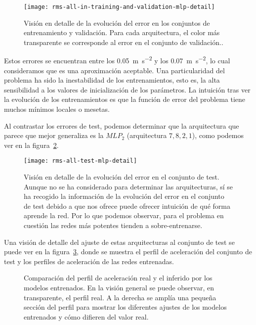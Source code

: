 \begin{figure}
	\centering
	\texttt{[image: rms-all-in-training-and-validation-mlp-detail]}
	\caption[Evolución del error en entrenamiento en los \ac{mlp} para las arquitecturas seleccionadas]{Visión en detalle de la evolución del error en los conjuntos de entrenamiento y validación. Para cada arquitectura, el color más transparente se corresponde al error en el conjunto de validación..}
	\label{fig:rms-all-in-training-and-validation-mlp-detail}
\end{figure}

Estos errores se encuentran entre los \SI{0.05}{\metre\per\square\second} y los \SI{0.07}{\metre\per\square\second}, lo cual consideramos que es una aproximación aceptable. Una particularidad del problema ha sido la inestabilidad de los entrenamientos, esto es, la alta sensibilidad a los valores de inicialización de los parámetros. La intuición tras ver la evolución de los entrenamientos es que la función de error del problema tiene muchos mínimos locales o mesetas.

Al contrastar los errores de test, podemos determinar que la arquitectura que parece que mejor generaliza es la $MLP_2$ (arquitectura $7, 8, 2, 1$), como podemos ver en la figura~\ref{fig:rms-all-test-mlp-detail}.

\begin{figure}
	\centering
	\texttt{[image: rms-all-test-mlp-detail]}
	\caption[Evolución del error en el conjunto de test durante el entrenamiento]{Visión en detalle de la evolución del error en el conjunto de test. Aunque no se ha considerado para determinar las arquitecturas, sí se ha recogido la información de la evolución del error en el conjunto de test debido a que nos ofrece puede ofrecer intuición de qué forma aprende la red. Por lo que podemos observar, para el problema en cuestión las redes más potentes tienden a sobre-entrenarse.}
	\label{fig:rms-all-test-mlp-detail}
\end{figure}

Una visión de detalle del ajuste de estas arquitecturas al conjunto de test se puede ver en la figura~\ref{fig:mlp-test-comparisons}, donde se muestra el perfil de aceleración del conjunto de test y los perfiles de aceleración de las redes entrenadas.

\begin{figure}
	\centering
	\qquad
	\caption[Comparación del perfil de aceleración real y el inferido por los modelos entrenados]{Comparación del perfil de aceleración real y el inferido por los modelos entrenados. En la visión general se puede observar, en transparente, el perfil real. A la derecha se amplía una pequeña sección del perfil para mostrar los diferentes ajustes de los modelos entrenados y cómo difieren del valor real.}
	\label{fig:mlp-test-comparisons}
\end{figure}

